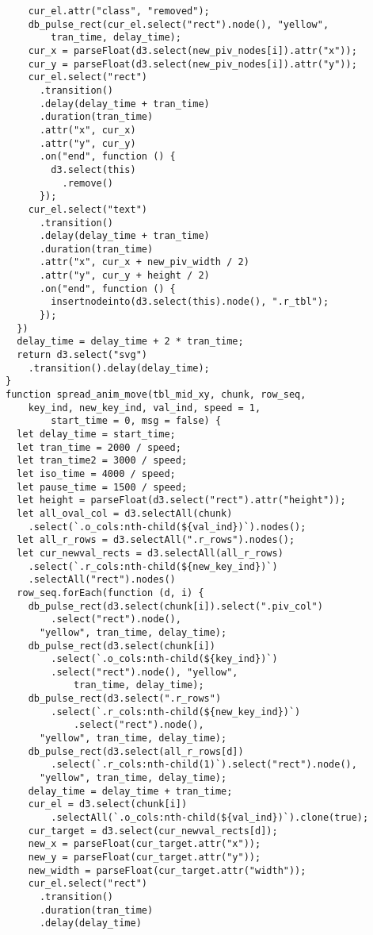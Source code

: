 \begin{lstlisting}
    cur_el.attr("class", "removed");
    db_pulse_rect(cur_el.select("rect").node(), "yellow", 
        tran_time, delay_time);
    cur_x = parseFloat(d3.select(new_piv_nodes[i]).attr("x"));
    cur_y = parseFloat(d3.select(new_piv_nodes[i]).attr("y"));
    cur_el.select("rect")
      .transition()
      .delay(delay_time + tran_time)
      .duration(tran_time)
      .attr("x", cur_x)
      .attr("y", cur_y)
      .on("end", function () {
        d3.select(this)
          .remove()
      });
    cur_el.select("text")
      .transition()
      .delay(delay_time + tran_time)
      .duration(tran_time)
      .attr("x", cur_x + new_piv_width / 2)
      .attr("y", cur_y + height / 2)
      .on("end", function () {
        insertnodeinto(d3.select(this).node(), ".r_tbl");
      });
  })
  delay_time = delay_time + 2 * tran_time;
  return d3.select("svg")
    .transition().delay(delay_time);
}
function spread_anim_move(tbl_mid_xy, chunk, row_seq, 
    key_ind, new_key_ind, val_ind, speed = 1, 
        start_time = 0, msg = false) {
  let delay_time = start_time;
  let tran_time = 2000 / speed;
  let tran_time2 = 3000 / speed;
  let iso_time = 4000 / speed;
  let pause_time = 1500 / speed;
  let height = parseFloat(d3.select("rect").attr("height"));
  let all_oval_col = d3.selectAll(chunk)
    .select(`.o_cols:nth-child(${val_ind})`).nodes();
  let all_r_rows = d3.selectAll(".r_rows").nodes();
  let cur_newval_rects = d3.selectAll(all_r_rows)
    .select(`.r_cols:nth-child(${new_key_ind})`)
    .selectAll("rect").nodes()
  row_seq.forEach(function (d, i) {
    db_pulse_rect(d3.select(chunk[i]).select(".piv_col")
        .select("rect").node(),
      "yellow", tran_time, delay_time);
    db_pulse_rect(d3.select(chunk[i])
        .select(`.o_cols:nth-child(${key_ind})`)
        .select("rect").node(), "yellow", 
            tran_time, delay_time);
    db_pulse_rect(d3.select(".r_rows")
        .select(`.r_cols:nth-child(${new_key_ind})`)
            .select("rect").node(),
      "yellow", tran_time, delay_time);
    db_pulse_rect(d3.select(all_r_rows[d])
        .select(`.r_cols:nth-child(1)`).select("rect").node(),
      "yellow", tran_time, delay_time);
    delay_time = delay_time + tran_time;
    cur_el = d3.select(chunk[i])
        .selectAll(`.o_cols:nth-child(${val_ind})`).clone(true);
    cur_target = d3.select(cur_newval_rects[d]);
    new_x = parseFloat(cur_target.attr("x"));
    new_y = parseFloat(cur_target.attr("y"));
    new_width = parseFloat(cur_target.attr("width"));
    cur_el.select("rect")
      .transition()
      .duration(tran_time)
      .delay(delay_time)

\end{lstlisting}
